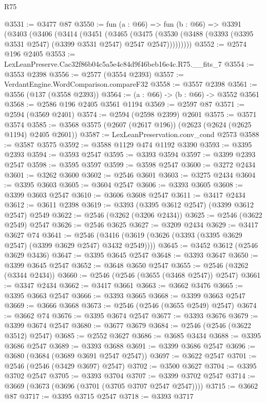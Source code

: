 \begin{lexlean}{R75}
\begin{coremodule}
@3531 := @3477 @87
@3550 := fun (a : @66) =>
  fun (b : @66) =>
  @3391
    (@3403
      (@3406
        (@3414
          (@3451
            (@3465
              (@3475
                (@3530 (@3488 (@3393 (@3395 @3531 @2547) (@3399 @3531 @2547) @2547 @2547)))))))))
@3552 := @2574 @196 @2405
@3553 := LexLeanPreserve.Cac32f86b04c5a5e4c84d9f46beb16e4c.R75.__fits_7
@3554 := @3553 @2398
@3556 := @2577 (@3554 @2393)
@3557 := VerdantEngine.WordComparison.compareF32
@3558 := @3557 @2398
@3561 := @3556 (@137 (@3558 @2393))
@3564 := (a : @66) -> (b : @66) -> @3552 @3561
@3568 := @2586 @196 @2405 @3561 @1194
@3569 := @2597 @87
@3571 := @2594 (@3569 @2401)
@3574 := @2594 (@2598 @2399) @2601
@3575 := @3571 @3574
@3585 := @3568 @3575 (@2607 (@2617 @196)) (@2623 (@2624 (@2625 @1194) @2405 @2601))
@3587 := LexLeanPreservation.conv_cond @2573
@3588 := @3587 @3575
@3592 := @3588 @1129 @474 @1192 @3390
@3593 := @3395 @2393
@3594 := @3593 @2547
@3595 := @3393 @3594
@3597 := @3399 @2393 @2547
@3598 := @3595 @3597
@3599 := @3598 @2547
@3600 := @3272 @2434
@3601 := @3262 @3600
@3602 := @2546 @3601
@3603 := @3275 @2434
@3604 := @3395 @3603
@3605 := @3604 @2547
@3606 := @3393 @3605
@3608 := @3399 @3603 @2547
@3610 := @3606 @3608 @2547
@3611 := @3417 @2434
@3612 := @3611 @2398
@3619 := @3393 (@3395 @3612 @2547) (@3399 @3612 @2547) @2549
@3622 := @2546 (@3262 (@3206 @2434))
@3625 := @2546 (@3622 @2549) @2547
@3626 := @2546 @3625
@3627 := @3209 @2434
@3629 := @3417 @3627 @74
@3641 := @2546 (@3416 (@3619 (@3626 (@3393 (@3395 @3629 @2547) (@3399 @3629 @2547) @3432 @2549))))
@3645 := @3452 @3612 (@2546 @3629 @3436)
@3647 := @3395 @3645 @2547
@3648 := @3393 @3647
@3650 := @3399 @3645 @2547
@3652 := @3648 @3650 @2547
@3655 := @2546 (@3262 (@3344 @2434))
@3660 := @2546 (@2546 (@3655 (@3468 @2547)) @2547)
@3661 := @3347 @2434
@3662 := @3417 @3661
@3663 := @3662 @3476
@3665 := @3395 @3663 @2547
@3666 := @3393 @3665
@3668 := @3399 @3663 @2547
@3669 := @3666 @3668
@3673 := @2546 (@2546 (@3655 @2549) @2547)
@3674 := @3662 @74
@3676 := @3395 @3674 @2547
@3677 := @3393 @3676
@3679 := @3399 @3674 @2547
@3680 := @3677 @3679
@3684 := @2546 (@2546 (@3622 @3512) @2547)
@3685 := @2552 @3627
@3686 := @3685 @3434
@3688 := @3395 @3686 @2547
@3689 := @3393 @3688
@3691 := @3399 @3686 @2547
@3696 := @3680 (@3684 (@3689 @3691 @2547 @2547))
@3697 := @3622 @2547
@3701 := @2546 (@2546 (@3429 @3697) @2547)
@3702 := @3500 @3627
@3704 := @3395 @3702 @2547
@3705 := @3393 @3704
@3707 := @3399 @3702 @2547
@3714 := @3669 (@3673 (@3696 (@3701 (@3705 @3707 @2547 @2547))))
@3715 := @3662 @87
@3717 := @3395 @3715 @2547
@3718 := @3393 @3717

\end{coremodule}
\end{lexlean}
